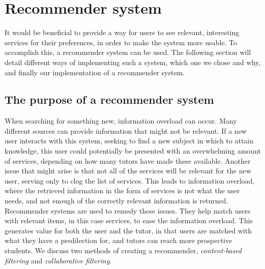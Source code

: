 \section{Recommender system}\label{Recommender-system}
It would be beneficial to provide a way for users to see relevant, interesting services for their preferences, in order to make the system more usable.
To accomplish this, a recommender system can be used.
The following section will detail different ways of implementing such a system, which one we chose and why, and finally our implementation of a recommender system.

\subsection{The purpose of a recommender system}
When searching for something new, information overload can occur.
Many different sources can provide information that might not be relevant.
If a new user interacts with this system, seeking to find a new subject in which to attain knowledge, this user could potentially be presented with an overwhelming amount of services, depending on how many tutors have made these available.
Another issue that might arise is that not all of the services will be relevant for the new user, serving only to clog the list of services. 
This leads to information overload, where the retrieved information in the form of services is not what the user needs, and not enough of the correctly relevant information is returned.
Recommender systems are used to remedy these issues.
They help match users with relevant items, in this case services, to ease the information overload.
This generates value for both the user and the tutor, in that users are matched with what they have a predilection for, and tutors can reach more prospective students.
We discuss two methods of creating a recommender, \textit{content-based filtering} and \textit{collaborative filtering}.


